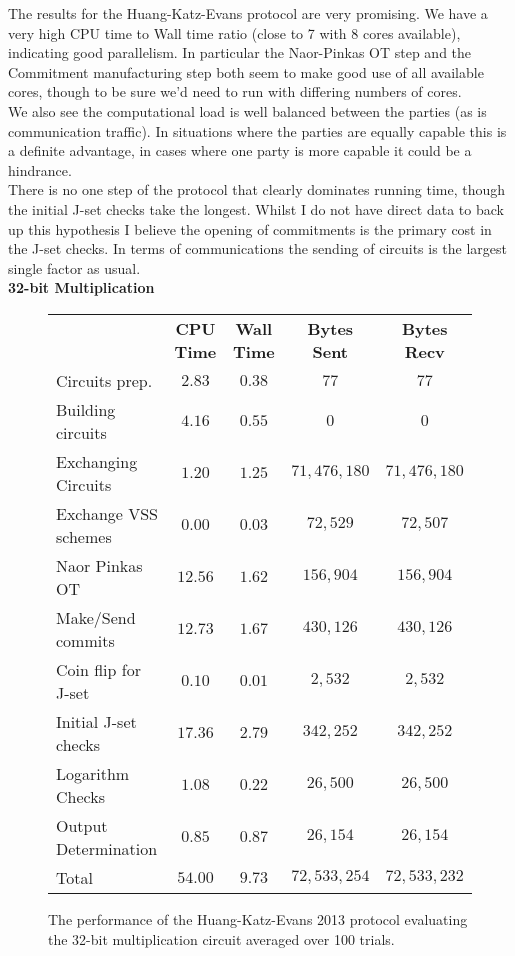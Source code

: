 \documentclass[ %
                    author={Nicholas Tutte},
                supervisor={Prof. Nigel Smart},
                    degree={MEng},
                     title={Secure Two Party Computation},
                  subtitle={A practical comparison of recent protocols},
                      type={Research - GG1K},
                      year={2015} ]{dissertation}
\begin{document}
				The results for the Huang-Katz-Evans protocol are very promising. We have a very high CPU time to Wall time ratio (close to 7 with 8 cores available), indicating good parallelism. In particular the Naor-Pinkas OT step and the Commitment manufacturing step both seem to make good use of all available cores, though to be sure we'd need to run with differing numbers of cores.\\ 

				We also see the computational load is well balanced between the parties (as is communication traffic). In situations where the parties are equally capable this is a definite advantage, in cases where one party is more capable it could be a hindrance.\\

				There is no one step of the protocol that clearly dominates running time, though the initial J-set checks take the longest. Whilst I do not have direct data to back up this hypothesis I believe the opening of commitments is the primary cost in the J-set checks. In terms of communications the sending of circuits is the largest single factor as usual.\\

				\FloatBarrier
				\noindent \textbf{32-bit Multiplication}
				\begin{figure}[!ht]
					\begin{tabular}{| p{4.3cm} | c c c c |}
						\hline
						 & \textbf{CPU Time} & \textbf{Wall Time} & \textbf{Bytes Sent} & \textbf{Bytes Recv} \\
						\thickhline
						Circuits prep. & $2.83$ & $0.38$ & $77$ & $77$ \\
						\hline
						Building circuits & $4.16$ & $0.55$ & $0$ & $0$ \\
						\hline
						Exchanging Circuits & $1.20$ & $1.25$ & $71,476,180$ & $71,476,180$ \\
						\hline
						Exchange VSS schemes & $0.00$ & $0.03$ & $72,529$ & $72,507$ \\
						\hline
						Naor Pinkas OT & $12.56$ & $1.62$ & $156,904$ & $156,904$ \\
						\hline
						Make/Send commits & $12.73$ & $1.67$ & $430,126$ & $430,126$ \\
						\hline
						Coin flip for J-set & $0.10$ & $0.01$ & $2,532$ & $2,532$ \\
						\hline
						Initial J-set checks & $17.36$ & $2.79$ & $342,252$ & $342,252$ \\
						\hline
						Logarithm Checks & $1.08$ & $0.22$ & $26,500$ & $26,500$ \\
						\hline
						Output Determination & $0.85$ & $0.87$ & $26,154$ & $26,154$ \\
						\thickhline
						Total & $54.00$ & $9.73$ & $72,533,254$ & $72,533,232$ \\
						\hline
					\end{tabular}
					\caption{The performance of the Huang-Katz-Evans 2013 protocol evaluating the 32-bit multiplication circuit averaged over 100 trials.\label{table:HKE_2013_Mul}}
				\end{figure}
\end{document}
